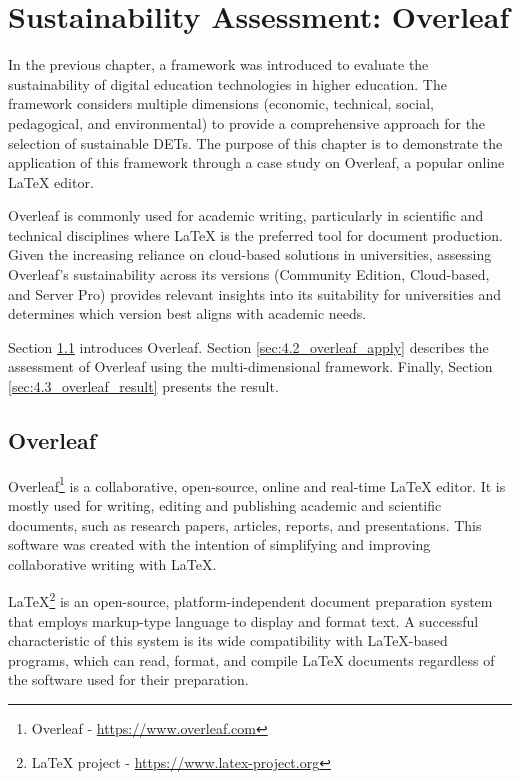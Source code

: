 \chapter{Sustainability Assessment: Overleaf}
\label{cha:4_case_studies}
In the previous chapter, a framework was introduced to evaluate the sustainability of digital education technologies in higher education. The framework considers multiple dimensions (economic, technical, social, pedagogical, and environmental) to provide a comprehensive approach for the selection of sustainable DETs. The purpose of this chapter is to demonstrate the application of this framework through a case study on Overleaf, a popular online LaTeX editor.

Overleaf is commonly used for academic writing, particularly in scientific and technical disciplines where LaTeX is the preferred tool for document production. Given the increasing reliance on cloud-based solutions in universities, assessing Overleaf’s sustainability across its versions (Community Edition, Cloud-based, and Server Pro) provides relevant insights into its suitability for universities and determines which version best aligns with academic needs.

Section \ref{sec:4.1_overleaf} introduces Overleaf. Section \ref{sec:4.2_overleaf_apply} describes the assessment of Overleaf using the multi-dimensional framework. Finally, Section \ref{sec:4.3_overleaf_result} presents the result.


\section{Overleaf}
\label{sec:4.1_overleaf}
Overleaf\footnote{Overleaf - \href{https://www.overleaf.com/}{https://www.overleaf.com}} is a collaborative, open-source, online and real-time LaTeX editor. It is mostly used for writing, editing and publishing academic and scientific documents, such as research papers, articles, reports, and presentations. This software was created with the intention of simplifying and improving collaborative writing with LaTeX.

LaTeX\footnote{LaTeX project - \href{https://www.latex-project.org/}{https://www.latex-project.org}} is an open-source, platform-independent document preparation system that employs markup-type language to display and format text. A successful characteristic of this system is its wide compatibility with LaTeX-based programs, which can read, format, and compile LaTeX documents regardless of the software used for their preparation.

